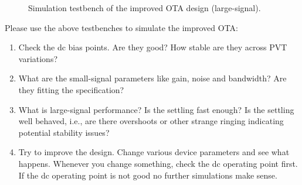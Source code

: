 \documentclass[
  a4paper,
  DIV=11,
  numbers=noendperiod]{scrartcl}
\providecommand{\tightlist}{%
  \setlength{\itemsep}{0pt}\setlength{\parskip}{0pt}}\usepackage{longtable,booktabs,array}
\begin{document}
\begin{figure}


\caption{\label{fig-improved-ota-design-tb-tran}Simulation testbench of
the improved OTA design (large-signal).}

\end{figure}%

\begin{tcolorbox}[enhanced jigsaw, titlerule=0mm, left=2mm, coltitle=black, toprule=.15mm, breakable, opacitybacktitle=0.6, colframe=quarto-callout-tip-color-frame, bottomtitle=1mm, toptitle=1mm, opacityback=0, colbacktitle=quarto-callout-tip-color!10!white, title=\textcolor{quarto-callout-tip-color}{\faLightbulb}\hspace{0.5em}{Exercise: Improved OTA Initial Simulation}, arc=.35mm, rightrule=.15mm, colback=white, bottomrule=.15mm, leftrule=.75mm]

Please use the above testbenches to simulate the improved OTA:

\begin{enumerate}
\def\labelenumi{\arabic{enumi}.}
\tightlist
\item
  Check the dc bias points. Are they good? How stable are they across
  PVT variations?
\item
  What are the small-signal parameters like gain, noise and bandwidth?
  Are they fitting the specification?
\item
  What is large-signal performance? Is the settling fast enough? Is the
  settling well behaved, i.e., are there overshoots or other strange
  ringing indicating potential stability issues?
\item
  Try to improve the design. Change various device parameters and see
  what happens. Whenever you change something, check the dc operating
  point first. If the dc operating point is not good no further
  simulations make sense.
\end{enumerate}

\end{tcolorbox}
\end{document}
